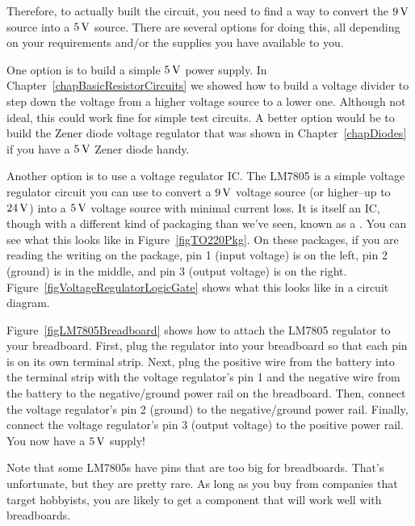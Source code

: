 Therefore, to actually built the circuit, you need to find a way to convert the $9\,\si{\volt}$ source into a $5\,\si{\volt}$ source.
There are several options for doing this, all depending on your requirements and/or the supplies you have available to you.

One option is to build a simple $5\,\si{\volt}$ power supply.
In Chapter~\ref{chapBasicResistorCircuits} we showed how to build a voltage divider to step down the voltage from a higher voltage source to a lower one.
Although not ideal, this could work fine for simple test circuits.
A better option would be to build the Zener diode voltage regulator that was shown in Chapter~\ref{chapDiodes} if you have a $5\,\si{\volt}$ Zener diode handy.


Another option is to use a voltage regulator IC.
The LM7805 is a simple voltage regulator circuit you can use to convert a $9\,\si{\volt}$ voltage source (or higher--up to $24\,\si{\volt}$) into a $5\,\si{\volt}$ voltage source with minimal current loss.
It is itself an IC, though with a different kind of packaging than we've seen, known as a .
You can see what this looks like in Figure~\ref{figTO220Pkg}.
On these packages, if you are reading the writing on the package, pin 1 (input voltage) is on the left, pin 2 (ground) is in the middle, and pin 3 (output voltage) is on the right.
Figure~\ref{figVoltageRegulatorLogicGate} shows what this looks like in a circuit diagram.



Figure~\ref{figLM7805Breadboard} shows how to attach the LM7805 regulator to your breadboard.
First, plug the regulator into your breadboard so that each pin is on its own terminal strip.
Next, plug the positive wire from the battery into the terminal strip with the voltage regulator's pin 1 and the negative wire from the battery to the negative/ground power rail on the breadboard.
Then, connect the voltage regulator's pin 2 (ground) to the negative/ground power rail. 
Finally, connect the voltage regulator's pin 3 (output voltage) to the positive power rail.
You now have a $5\,\si{\volt}$ supply!

Note that some LM7805s have pins that are too big for breadboards.
That's unfortunate, but they are pretty rare.  
As long as you buy from companies that target hobbyists, you are likely to get a component that will work well with breadboards.

